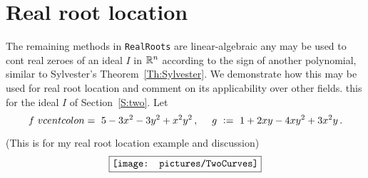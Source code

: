 
\section{Real root location}\label{S:three}
%
%
The remaining methods in  \texttt{RealRoots} are linear-algebraic any may be used to cont real zeroes of an ideal $I$ in
$\mathbb{R}^n$ according to the sign of another polynomial, similar to Sylvester's Theorem~\ref{Th:Sylvester}.
We demonstrate how this may be used for real root location and comment on its applicability over other fields.
 this for the ideal $I$ of Section~\ref{S:two}.
Let
\[
f\ vcentcolon=\ 5-3x^2-3y^2+x^2y^2\,,
\ \quad
g\ \vcentcolon=\ 1+2xy-4xy^2+3x^2y\,.
\]


(This is for my real root location example and discussion)
\[
\fbox{\texttt{[image: pictures/TwoCurves]}}
\]
%
%
\newpage
